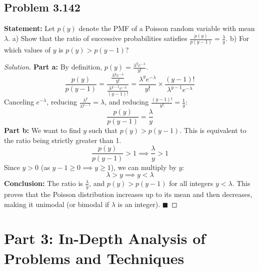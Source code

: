 \documentclass[11pt]{article}
\theoremstyle{definition}
\theoremstyle{remark}
\begin{document}
\subsection*{Problem 3.142}
\textbf{Statement:} Let $p(y)$ denote the PMF of a Poisson random variable with mean $\lambda$. a) Show that the ratio of successive probabilities satisfies $\frac{p(y)}{p(y-1)} = \frac{\lambda}{y}$. b) For which values of $y$ is $p(y) > p(y-1)$?

\begin{proof}[Solution]
\textbf{Part a:}
By definition, $p(y) = \frac{\lambda^y e^{-\lambda}}{y!}$.
\[ \frac{p(y)}{p(y-1)} = \frac{\frac{\lambda^y e^{-\lambda}}{y!}}{\frac{\lambda^{y-1} e^{-\lambda}}{(y-1)!}} = \frac{\lambda^y e^{-\lambda}}{y!} \times \frac{(y-1)!}{\lambda^{y-1} e^{-\lambda}} \]
Canceling $e^{-\lambda}$, reducing $\frac{\lambda^y}{\lambda^{y-1}} = \lambda$, and reducing $\frac{(y-1)!}{y!} = \frac{1}{y}$:
\[ \frac{p(y)}{p(y-1)} = \frac{\lambda}{y} \]
\textbf{Part b:}
We want to find $y$ such that $p(y) > p(y-1)$. This is equivalent to the ratio being strictly greater than 1.
\[ \frac{p(y)}{p(y-1)} > 1 \implies \frac{\lambda}{y} > 1 \]
Since $y > 0$ (as $y-1 \ge 0 \implies y \ge 1$), we can multiply by $y$:
\[ \lambda > y \implies y < \lambda \]
\textbf{Conclusion:} The ratio is $\frac{\lambda}{y}$, and $p(y) > p(y-1)$ for all integers $y < \lambda$. This proves that the Poisson distribution increases up to its mean and then decreases, making it unimodal (or bimodal if $\lambda$ is an integer). $\blacksquare$
\end{proof}

\newpage
\section{Part 3: In-Depth Analysis of Problems and Techniques}
\end{document}
